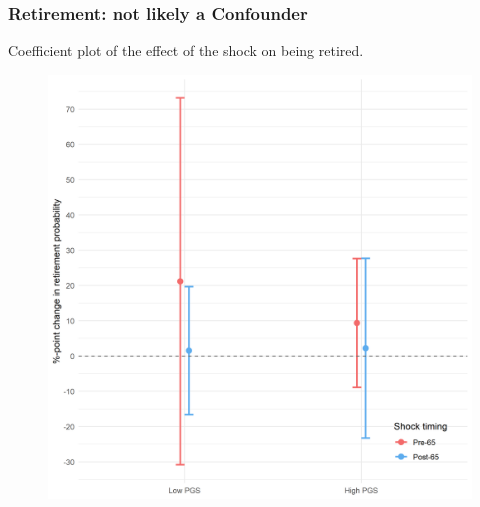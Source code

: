 \documentclass[10pt,compress,xcolor=dvipsnames,aspectratio=169]{beamer}    %
\newcounter{ex}
\newcommand{\1}[1]{\mathrm{1\hspace*{-2.5pt}l}[#1]}	%
\begin{document}
\begin{frame}
\frametitle{Retirement: not likely a Confounder}
Coefficient plot of the effect of the shock on being retired.
\begin{figure}[hbtp]
\centering
\includegraphics[height=0.8\textheight]{../../3_output/shock_effects/retired_6070_100_cvplot.png}
\label{fig:retire}
\end{figure}
\end{frame}
\end{document}
